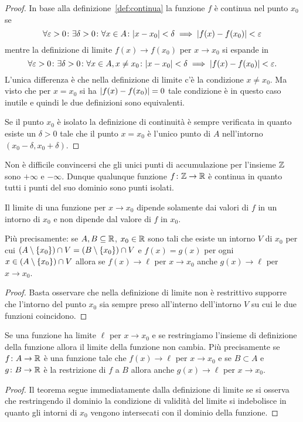   \begin{proof}
  In base alla definizione~\ref{def:continua} la funzione $f$ è continua nel
  punto $x_0$ se
  \[
   \forall \varepsilon>0 \colon \exists \delta >0 \colon
   \forall x \in A\colon
   {\left|x-x_0\right|}<\delta \implies {\left|f(x)-f(x_0)\right|} < \varepsilon
  \]
  mentre la definizione di limite $f(x)\to f(x_0)$ per $x\to x_0$
  si espande in
  \[
  \forall \varepsilon>0 \colon \exists \delta>0\colon
  \forall x \in A, x\neq x_0\colon
  {\left|x-x_0\right|}<\delta \implies {\left|f(x)-f(x_0)\right|} < \varepsilon.
  \]
  L'unica differenza è che nella definizione di limite
  c'è la condizione $x\neq x_0$. Ma visto che per $x=x_0$
  si ha ${\left|f(x)-f(x_0)\right|}=0$ tale condizione è in questo caso 
  inutile e quindi le due definizioni sono equivalenti.

  Se il punto $x_0$ è isolato la definizione di continuità
  è sempre verificata in quanto esiste un $\delta>0$ 
  tale che il punto $x=x_0$ è l'unico punto di $A$ 
  nell'intorno $(x_0-\delta,x_0+\delta)$.
  \end{proof}

\begin{example}
  Non è difficile convincersi che gli unici punti di accumulazione 
  per l'insieme ${\mathbb Z}$ sono $+\infty$ e $-\infty$.
  Dunque qualunque funzione $f\colon {\mathbb Z} \to {\mathbb R}$ è continua in quanto 
  tutti i punti del suo dominio sono punti isolati.
\end{example}
  
\begin{theorem}%
\label{th:localita_limite}%
Il limite di una funzione per $x\to x_0$ dipende solamente dai valori di $f$
in un intorno di $x_0$ e non dipende dal valore di $f$ in $x_0$.

Più precisamente: se $A,B\subseteq {\mathbb R}$, $x_0\in {\mathbb R}$ sono tali che 
esiste un intorno $V$ di $x_0$ per cui 
$(A\setminus{\left\{ x_0 \right\}}) \cap  V = (B\setminus {\left\{ x_0 \right\}}) \cap V$ 
e $f(x)=g(x)$ per ogni $x\in(A\setminus{\left\{ x_0 \right\}}) \cap  V$ 
allora se $f(x)\to \ell$ per $x\to x_0$ anche $g(x)\to \ell$ 
per $x\to x_0$.
\end{theorem}
%
\begin{proof}
  Basta osservare che nella definizione di limite 
  non è restrittivo supporre che l'intorno del punto $x_0$ 
  sia sempre preso all'interno dell'intorno $V$ su cui 
  le due funzioni coincidono.
\end{proof}

\begin{theorem}
Se una funzione ha limite $\ell$ per $x\to x_0$ 
e se restringiamo l'insieme di definizione della funzione 
allora il limite della funzione non cambia. 
Più precisamente
se $f\colon A \to {\mathbb R}$ è una funzione tale che $f(x)\to \ell$ per $x\to x_0$
e se $B \subset A$ e $g\colon B\to {\mathbb R}$ è la restrizione di $f$ 
a $B$ allora anche $g(x)\to \ell$ per $x\to x_0$. 
\end{theorem}
%
\begin{proof}
Il teorema segue immediatamente dalla definizione di limite se si osserva
che restringendo il dominio la condizione di validità del limite si indebolisce
in quanto gli intorni di $x_0$ vengono intersecati con il dominio della funzione.
\end{proof}


